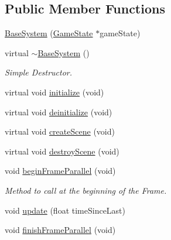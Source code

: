 \subsection*{Public Member Functions}
\begin{DoxyCompactItemize}
\item 
\hyperlink{class_common_1_1_base_system_a420a9f2bb9ccec58af8de74cfc71a9fd}{Base\+System} (\hyperlink{class_common_1_1_game_state}{Game\+State} $\ast$game\+State)
\item 
\mbox{\label{class_common_1_1_base_system_a90dcca3acf8e4a37aa0036125ec6b830}} 
virtual \hyperlink{class_common_1_1_base_system_a90dcca3acf8e4a37aa0036125ec6b830}{$\sim$\+Base\+System} ()
\begin{DoxyCompactList}\small\item\em Simple Destructor. \end{DoxyCompactList}\item 
virtual void \hyperlink{class_common_1_1_base_system_a84f42ac8703c9121f29e341070a26c4f}{initialize} (void)
\item 
virtual void \hyperlink{class_common_1_1_base_system_a081f0d3daaff552efe736e6096d329e9}{deinitialize} (void)
\item 
virtual void \hyperlink{class_common_1_1_base_system_a1f26fc7376152a90de585fd50c396427}{create\+Scene} (void)
\item 
virtual void \hyperlink{class_common_1_1_base_system_a04ce870b4d3429942afb58137fd376ca}{destroy\+Scene} (void)
\item 
\mbox{\label{class_common_1_1_base_system_a631f234a7a0e46e9f6476520cd2f9bab}} 
void \hyperlink{class_common_1_1_base_system_a631f234a7a0e46e9f6476520cd2f9bab}{begin\+Frame\+Parallel} (void)
\begin{DoxyCompactList}\small\item\em Method to call at the beginning of the Frame. \end{DoxyCompactList}\item 
void \hyperlink{class_common_1_1_base_system_af71a7156da8b0a4feab83ad72162a0c2}{update} (float time\+Since\+Last)
\item 
\mbox{\label{class_common_1_1_base_system_a50d9e0044a1cc4b400b847c923913d81}} 
void \hyperlink{class_common_1_1_base_system_a50d9e0044a1cc4b400b847c923913d81}{finish\+Frame\+Parallel} (void)

\end{DoxyCompactItemize}
